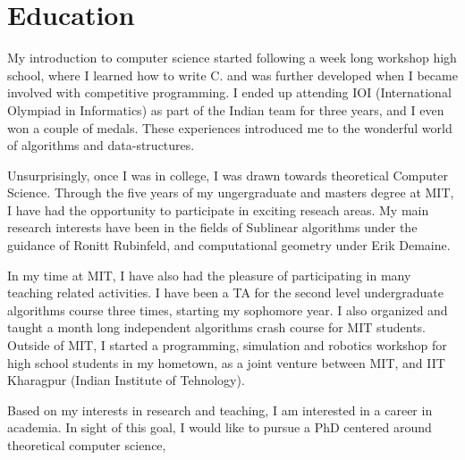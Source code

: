 \section*{Education}

My introduction to computer science started following a week long workshop high school, where I learned how to write C.
and was further developed when I became involved with competitive programming.
I ended up attending IOI (International Olympiad in Informatics) as part of the Indian team for three years,
and I even won a couple of medals.
These experiences introduced me to the wonderful world of algorithms and data-structures.

Unsurprisingly, once I was in college, I was drawn towards theoretical Computer Science.
Through the five years of my ungergraduate and masters degree at MIT,
I have had the opportunity to participate in exciting reseach areas. 
My main research interests have been in the fields of Sublinear algorithms under the guidance of Ronitt Rubinfeld,
and computational geometry under Erik Demaine.

In my time at MIT, I have also had the pleasure of participating in many teaching related activities.
I have been a TA for the second level undergraduate algorithms course three times, starting my sophomore year.
I also organized and taught a month long independent algorithms crash course for MIT students.
Outside of MIT, I started a programming, simulation and robotics workshop for high school students in my hometown,
as a joint venture between MIT, and IIT Kharagpur (Indian Institute of Tehnology).

Based on my interests in research and teaching, I am interested in a career in academia.
In sight of this goal, I would like to pursue a PhD centered around theoretical computer science,
